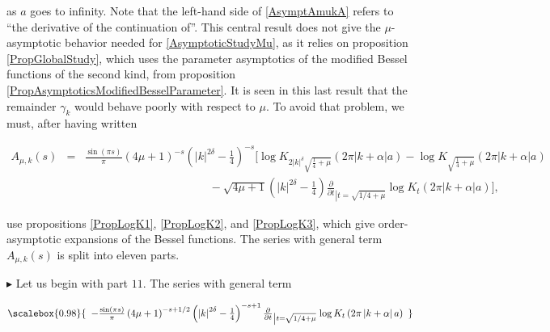 \documentclass{jams-l}
\theoremstyle{definition}
\theoremstyle{remark}
\numberwithin{equation}{section}
\newcommand\scalemath[2]{\scalebox{#1}{\mbox{\ensuremath{\displaystyle #2}}}}
\begin{document}
                \noindent as $a$ goes to infinity. Note that the left-hand side of \eqref{AsymptAmukA} refers to ``the derivative of the continuation of''. This central result does not give the $\mu$-asymptotic behavior needed for \eqref{AsymptoticStudyMu}, as it relies on proposition \ref{PropGlobalStudy}, which uses the parameter asymptotics of the modified Bessel functions of the second kind, from proposition \ref{PropAsymptoticsModifiedBesselParameter}. It is seen in this last result that the remainder $\gamma_k$ would behave poorly with respect to $\mu$. To avoid that problem, we must, after having written
                
                \[ \begin{array}{lll}
                        \scriptstyle A_{\mu,k} \left( s \right) & \scriptstyle = & \scriptstyle \frac{\sin \left( \pi s \right)}{\pi} \left( 4 \mu+1 \right)^{-s} \left( \left \vert k \right \vert^{2 \delta} - \frac{1}{4} \right)^{-s} \Big[ \log K_{2 \left \vert k \right \vert^{\delta} \sqrt{\frac{1}{4} + \mu}} \left( 2 \pi \left \vert k + \alpha \right \vert a \right) - \log K_{\sqrt{\frac{1}{4} + \mu}} \left( 2 \pi \left \vert k + \alpha \right \vert a \right) \\[1em]
                        
                        && \qquad \qquad \qquad \qquad \qquad \quad \scriptstyle - \sqrt{4 \mu + 1} \left( \left \vert k \right \vert^{2 \delta} - \frac{1}{4} \right) \frac{\partial}{\partial t}_{\left \vert t = \sqrt{1/4 + \mu} \right.} \log K_t \left( 2 \pi \left \vert k + \alpha \right \vert a \right) \Big],
                    \end{array} \]
                
                \noindent use propositions \ref{PropLogK1}, \ref{PropLogK2}, and \ref{PropLogK3}, which give order-asymptotic expansions of the Bessel functions. The series with general term $A_{\mu,k} \left( s \right)$ is split into eleven parts.
            
                \medskip
            
                \hspace{30pt} $\blacktriangleright$ Let us begin with part $11$. The series with general term
                
                    \begin{equation}  
                    \label{PartialDerivativeTerm}
                        \scalemath{0.98}{\begin{array}{c}
                            - \frac{\sin \left( \pi s \right)}{\pi} \left( 4 \mu+1 \right)^{-s+1/2} \left( \left \vert k \right \vert^{2 \delta} - \frac{1}{4} \right)^{-s+1} \frac{\partial}{\partial t}_{\left \vert t = \sqrt{1/4 + \mu} \right.} \log K_t \left( 2 \pi \left \vert k + \alpha \right \vert a \right)
                        \end{array}}
                    \end{equation}
                    
\end{document}
